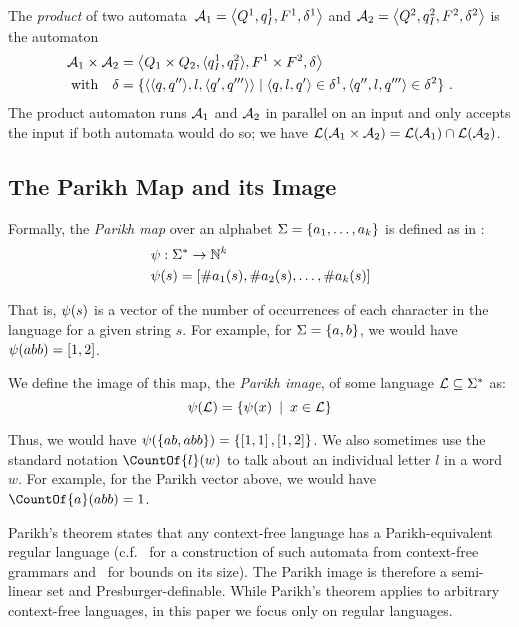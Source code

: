 The \emph{product} of two
automata~$\mathcal{A}_1 = \left\langle Q^1, q_I^1,
  F^1, \delta^1\right\rangle$ and
$\mathcal{A}_2 = \left\langle Q^2, q_I^2,
  F^2, \delta^2\right\rangle$ is the automaton
\begin{align*}
\mathcal{A}_1 \times \mathcal{A}_2 &=
\left\langle Q_1 \times Q_2, \langle q_I^1, q_I^2\rangle,
F^1 \times F^2,
  \delta\right\rangle\\
  \text{with}\quad \delta &= \{\langle\langle q,q''\rangle, l, \langle q',q'''\rangle\rangle \mid \langle q, l, q'\rangle \in \delta^1, \langle q'', l, q'''\rangle \in \delta^2\}~.
\end{align*}
The product automaton runs $\mathcal{A}_1$ and $\mathcal{A}_2$ in
parallel on an input and only accepts the input if both automata would
do so; we have $\operatorname{\mathcal{L}}(\mathcal{A}_1 \times \mathcal{A}_2) =
\operatorname{\mathcal{L}}(\mathcal{A}_1) \cap \operatorname{\mathcal{L}}(\mathcal{A}_2)$.

\subsection{The Parikh Map and its Image}
Formally, the \textit{Parikh map} over an alphabet $\Sigma=
\left\{a_1, \ldots, a_k \right\}$ is defined as in \cite{kozen}:
$$
\begin{aligned}
& \operatorname{\psi}: \Sigma^* \rightarrow \mathbb{N}^k \\
& \operatorname{\psi}(s) = \left[{\#a_1(s), \#a_2(s), \ldots, \#a_k(s)}\right]
\end{aligned}
$$

That is, $\operatorname{\psi}(s)$ is a vector of the number of occurrences of each
character in the language for a given string $s$. For example, for  $\Sigma =
\left\{a, b\right\}$, we would have $\operatorname{\psi}(abb) = \left[{1, 2}\right]$.

We define the image of this map, the \textit{Parikh image}, of some
language $\operatorname{\mathcal{L}} \subseteq \Sigma^*$ as:
\[
\operatorname{\psi}(\operatorname{\mathcal{L}}) = \left\{\operatorname{\psi}(x) \:\mid\: x \in \operatorname{\mathcal{L}}\right\}
\]

Thus, we would have $\operatorname{\psi}(\left\{ab, abb\right\}) = \left\{\left[1,
1\right], \left[1, 2\right]\right\}$. We also sometimes use the standard
notation $\CountOf{l}(w)$ to talk about an individual letter $l$ in a word $w$. For
example, for the Parikh vector above, we would have $\CountOf{a}(abb) = 1$.

Parikh's theorem states that any context-free language has a Parikh-equivalent
regular language (c.f.~\cite{construction} for a construction of such automata
from context-free grammars and~\cite{bounds} for bounds on its size).
The Parikh image is therefore a semi-linear set and Presburger-definable.
%
While Parikh's theorem applies to arbitrary context-free languages, in this
paper we focus only on regular languages.

